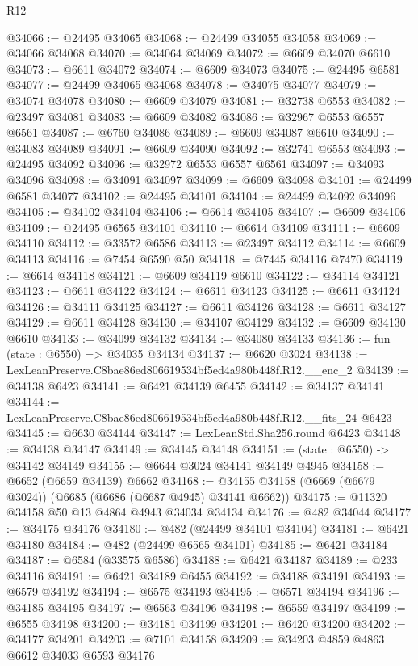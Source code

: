 \begin{lexlean}{R12}
\begin{coremodule}
@34066 := @24495 @34065
@34068 := @24499 @34055 @34058
@34069 := @34066 @34068
@34070 := @34064 @34069
@34072 := @6609 @34070 @6610
@34073 := @6611 @34072
@34074 := @6609 @34073
@34075 := @24495 @6581
@34077 := @24499 @34065 @34068
@34078 := @34075 @34077
@34079 := @34074 @34078
@34080 := @6609 @34079
@34081 := @32738 @6553
@34082 := @23497 @34081
@34083 := @6609 @34082
@34086 := @32967 @6553 @6557 @6561
@34087 := @6760 @34086
@34089 := @6609 @34087 @6610
@34090 := @34083 @34089
@34091 := @6609 @34090
@34092 := @32741 @6553
@34093 := @24495 @34092
@34096 := @32972 @6553 @6557 @6561
@34097 := @34093 @34096
@34098 := @34091 @34097
@34099 := @6609 @34098
@34101 := @24499 @6581 @34077
@34102 := @24495 @34101
@34104 := @24499 @34092 @34096
@34105 := @34102 @34104
@34106 := @6614 @34105
@34107 := @6609 @34106
@34109 := @24495 @6565 @34101
@34110 := @6614 @34109
@34111 := @6609 @34110
@34112 := @33572 @6586
@34113 := @23497 @34112
@34114 := @6609 @34113
@34116 := @7454 @6590 @50
@34118 := @7445 @34116 @7470
@34119 := @6614 @34118
@34121 := @6609 @34119 @6610
@34122 := @34114 @34121
@34123 := @6611 @34122
@34124 := @6611 @34123
@34125 := @6611 @34124
@34126 := @34111 @34125
@34127 := @6611 @34126
@34128 := @6611 @34127
@34129 := @6611 @34128
@34130 := @34107 @34129
@34132 := @6609 @34130 @6610
@34133 := @34099 @34132
@34134 := @34080 @34133
@34136 := fun (state : @6550) => @34035 @34134
@34137 := @6620 @3024
@34138 := LexLeanPreserve.C8bae86ed806619534bf5ed4a980b448f.R12.__enc_2
@34139 := @34138 @6423
@34141 := @6421 @34139 @6455
@34142 := @34137 @34141
@34144 := LexLeanPreserve.C8bae86ed806619534bf5ed4a980b448f.R12.__fits_24 @6423
@34145 := @6630 @34144
@34147 := LexLeanStd.Sha256.round @6423
@34148 := @34138 @34147
@34149 := @34145 @34148
@34151 := (state : @6550) -> @34142 @34149
@34155 := @6644 @3024 @34141 @34149 @4945
@34158 := @6652 (@6659 @34139) @6662
@34168 := @34155 @34158 (@6669 (@6679 @3024)) (@6685 (@6686 (@6687 @4945) @34141 @6662))
@34175 := @11320 @34158 @50 @13 @4864 @4943 @34034 @34134
@34176 := @482 @34044
@34177 := @34175 @34176
@34180 := @482 (@24499 @34101 @34104)
@34181 := @6421 @34180
@34184 := @482 (@24499 @6565 @34101)
@34185 := @6421 @34184
@34187 := @6584 (@33575 @6586)
@34188 := @6421 @34187
@34189 := @233 @34116
@34191 := @6421 @34189 @6455
@34192 := @34188 @34191
@34193 := @6579 @34192
@34194 := @6575 @34193
@34195 := @6571 @34194
@34196 := @34185 @34195
@34197 := @6563 @34196
@34198 := @6559 @34197
@34199 := @6555 @34198
@34200 := @34181 @34199
@34201 := @6420 @34200
@34202 := @34177 @34201
@34203 := @7101 @34158
@34209 := @34203 @4859 @4863 @6612 @34033 @6593 @34176

\end{coremodule}
\end{lexlean}
